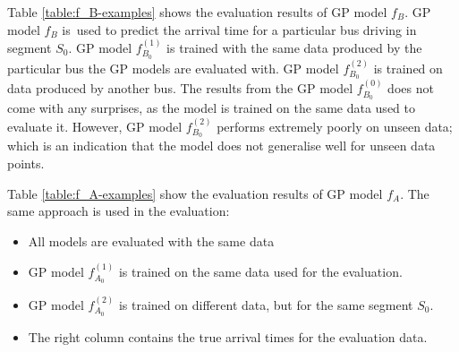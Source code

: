 Table \ref{table:f_B-examples} shows the evaluation results of GP model $f_B$.
GP model $f_B$ is used to predict the arrival time for a particular bus driving in segment $S_0$.
GP model $f^{(1)}_{B_0}$ is trained with the same data produced by the particular bus the GP models are evaluated with.
GP model $f^{(2)}_{B_0}$ is trained on data produced by another bus.
The results from the GP model $f^{(0)}_{B_0}$ does not come with any surprises, as the model is trained on the same data used to evaluate it.
However, GP model $f^{(2)}_{B_0}$ performs extremely poorly on unseen data; which is an indication that the model does not generalise well for unseen data points.

Table \ref{table:f_A-examples} show the evaluation results of GP model $f_A$.
The same approach is used in the evaluation:
\begin{itemize}
    \item All models are evaluated with the same data
    \item GP model $f^{(1)}_{A_0}$ is trained on the same data used for the evaluation.
    \item GP model $f^{(2)}_{A_0}$ is trained on different data, but for the same segment $S_0$.
    \item The right column contains the true arrival times for the evaluation data.
\end{itemize}

